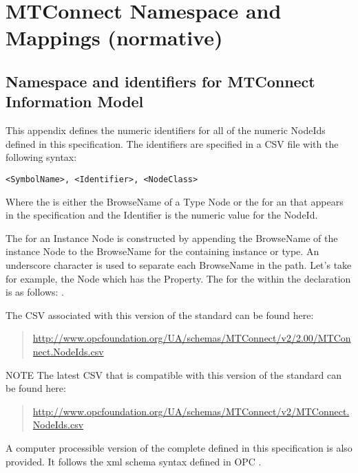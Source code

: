 
\section{MTConnect Namespace and  Mappings \newline (normative)}

\subsection{Namespace and identifiers for MTConnect Information Model}

This appendix defines the numeric identifiers for all of the numeric NodeIds defined in this specification. The identifiers are specified in a CSV file with the following syntax:

\texttt{<SymbolName>, <Identifier>, <NodeClass>}

Where the  is either the \gls{BrowseName} of a Type \gls{Node} or the  for an   that appears in the specification and the Identifier is the numeric value for the \gls{NodeId}.

The  for an Instance \gls{Node} is constructed by appending the \gls{BrowseName} of the instance \gls{Node} to the \gls{BrowseName} for the containing instance or type. An underscore character is used to separate each \gls{BrowseName} in the path. Let’s take for example, the   Node which has the  \gls{Property}. The  for the   within the  declaration is as follows: .

The CSV associated with this version of the standard can be found here:%
\begin{quote}
    \footnotesize{\url{http://www.opcfoundation.org/UA/schemas/MTConnect/v2/2.00/MTConnect.NodeIds.csv}}
\end{quote}

NOTE The latest CSV that is compatible with this version of the standard can be found here:%
\begin{quote}
    \footnotesize{\url{http://www.opcfoundation.org/UA/schemas/MTConnect/v2/MTConnect.NodeIds.csv}}
\end{quote}

A computer processible version of the complete  defined in this specification is also provided. It follows the \gls{xml}  schema syntax defined in OPC \cite{UAPart6}.


